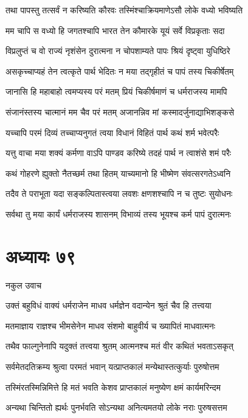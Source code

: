 \twolineshloka
{तथा पापस्तु तत्सर्वं न करिष्यति कौरवः}
{तस्मिंश्चाक्रियमाणेऽसौ लोके वध्यो भविष्यति}


\twolineshloka
{मम चापि स वध्यो हि जगतश्चापि भारत}
{तेन कौमारके यूयं सर्वे विप्रकृताः सदा}


\twolineshloka
{विप्रलुप्तं च वो राज्यं नृशंसेन दुरात्मना}
{न चोपशाम्यते पापः श्रियं दृष्ट्वा युधिष्ठिरे}


\twolineshloka
{असकृच्चाप्यहं तेन त्वत्कृते पार्थ भेदितः}
{न मया तद्गृहीतं च पापं तस्य चिकीर्षेतम्}


\twolineshloka
{जानासि हि महाबाहो त्वमप्यस्य परं मतम्}
{प्रियं चिकीर्षमाणं च धर्मराजस्य मामपि}


\twolineshloka
{संजानंस्तस्य चात्मानं मम चैव परं मतम्}
{अजानन्निव मां कस्मादर्जुनाद्याभिशङ्कसे}


\twolineshloka
{यच्चापि परमं दिव्यं तच्चाप्यनुगतं त्वया}
{विधानं विहितं पार्थ कथं शर्म भवेत्परैः}


\twolineshloka
{यत्तु वाचा मया शक्यं कर्मणा वाऽपि पाण्डव}
{करिष्ये तदहं पार्थ न त्वाशंसे शमं परैः}


\twolineshloka
{कथं गोहरणे ह्युक्तो नैतच्छर्म तथा हितम्}
{याच्यमानो हि भीष्मेण संवत्सरगतेऽध्वनि}


\twolineshloka
{तदैव ते पराभूता यदा सङ्कल्पितास्त्वया}
{लवशः क्षणशश्चापि न च तुष्टः सुयोधनः}


\twolineshloka
{सर्वथा तु मया कार्यं धर्मराजस्य शासनम्}
{विभाव्यं तस्य भूयश्च कर्म पापं दुरात्मनः}


\chapter{अध्यायः ७९}
\twolineshloka
{नकुल उवाच}
{}


\twolineshloka
{उक्तं बहुविधं वाक्यं धर्मराजेन माधव}
{धर्मज्ञेन वदान्येन श्रुतं चैव हि तत्त्वया}


\twolineshloka
{मतमाज्ञाय राज्ञश्च भीमसेनेन माधव}
{संशमो बाहुवीर्य च ख्यापितं माधवात्मनः}


\twolineshloka
{तथैव फाल्गुनेनापि यदुक्तं तत्त्वया श्रुतम्}
{आत्मनश्च मतं वीर कथितं भवताऽसकृत्}


\twolineshloka
{सर्वमेतदतिक्रम्य श्रुत्वा परमतं भवान्}
{यत्प्राप्तकालं मन्येथास्तत्कुर्याः पुरुषोत्तम}


\twolineshloka
{तस्मिंरतस्मिन्निमित्ते हि मतं भवति केशव}
{प्राप्तकालं मनुष्येण क्षमं कार्यमरिन्दम}


\twolineshloka
{अन्यथा चिन्तितो ह्यर्थः पुनर्भवति सोऽन्यथा}
{अनित्यमतयो लोके नराः पुरुषसत्तम}


